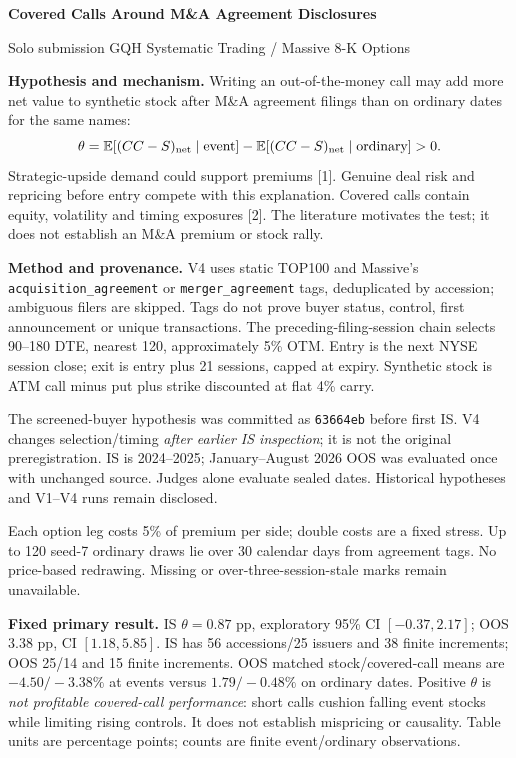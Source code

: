 \documentclass[11pt,letterpaper]{article}
\begin{document}
{\large\bfseries Covered Calls Around M\&A Agreement Disclosures}\par
Solo submission \hfill GQH Systematic Trading / Massive 8-K Options\par

\textbf{Hypothesis and mechanism.}
Writing an out-of-the-money call may add more net value to synthetic stock after M\&A agreement filings than on ordinary dates for the same names:
\[
\theta=\mathbb{E}[(CC-S)_{\rm net}\mid\text{event}]
       -\mathbb{E}[(CC-S)_{\rm net}\mid\text{ordinary}]>0.
\]
Strategic-upside demand could support premiums [1]. Genuine deal risk and repricing before entry compete with this explanation. Covered calls contain equity, volatility and timing exposures [2]. The literature motivates the test; it does not establish an M\&A premium or stock rally.

\textbf{Method and provenance.}
V4 uses static TOP100 and Massive's \texttt{acquisition\_agreement} or \texttt{merger\_agreement} tags, deduplicated by accession; ambiguous filers are skipped. Tags do not prove buyer status, control, first announcement or unique transactions. The preceding-filing-session chain selects 90--180 DTE, nearest 120, approximately 5\% OTM. Entry is the next NYSE session close; exit is entry plus 21 sessions, capped at expiry. Synthetic stock is ATM call minus put plus strike discounted at flat 4\% carry.

The screened-buyer hypothesis was committed as \texttt{63664eb} before first IS. V4 changes selection/timing \emph{after earlier IS inspection}; it is not the original preregistration. IS is 2024--2025; January--August 2026 OOS was evaluated once with unchanged source. Judges alone evaluate sealed dates. Historical hypotheses and V1--V4 runs remain disclosed.

Each option leg costs 5\% of premium per side; double costs are a fixed stress. Up to 120 seed-7 ordinary draws lie over 30 calendar days from agreement tags. No price-based redrawing. Missing or over-three-session-stale marks remain unavailable.

\textbf{Fixed primary result.}
IS $\theta=0.87$ pp, exploratory 95\% CI $[-0.37,2.17]$; OOS $3.38$ pp, CI $[1.18,5.85]$. IS has 56 accessions/25 issuers and 38 finite increments; OOS 25/14 and 15 finite increments. OOS matched stock/covered-call means are $-4.50/-3.38\%$ at events versus $1.79/-0.48\%$ on ordinary dates. Positive $\theta$ is \emph{not profitable covered-call performance}: short calls cushion falling event stocks while limiting rising controls. It does not establish mispricing or causality. Table units are percentage points; counts are finite event/ordinary observations.
\end{document}
